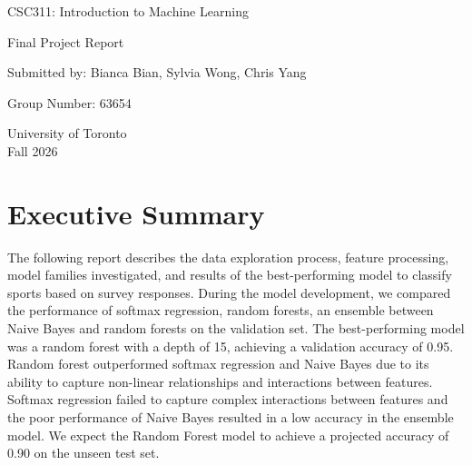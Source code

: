 \documentclass[12pt]{article}
\begin{document}
\begin{titlepage}
\centering
\vspace*{3cm}
{\Large {CSC311: Introduction to Machine Learning} \par}
\vspace{1cm}
{\Large {Final Project Report} \par}
\vspace{1cm}
\vspace{3cm}
{\large Submitted by: Bianca Bian, Sylvia Wong, Chris Yang \par}
{\large Group Number: 63654 \par}
\vspace{0.5cm}
\vfill
{\large University of Toronto \\ Fall 2026 \par}
\end{titlepage}
\clearpage
\setcounter{page}{1}
\section{Executive Summary}

The following report describes the data exploration process, feature processing, model families investigated, and results of the best-performing model to classify sports based on survey responses. During the model development, we compared the performance of softmax regression, random forests, an ensemble between Naive Bayes and random forests on the validation set. The best-performing model was a random forest with a depth of 15, achieving a validation accuracy of 0.95. Random forest outperformed softmax regression and Naive Bayes due to its ability to capture non-linear relationships and interactions between features. Softmax regression failed to capture complex interactions between features and the poor performance of Naive Bayes resulted in a low accuracy in the ensemble model. We expect the Random Forest model to achieve a projected accuracy of 0.90 on the unseen test set.
\end{document}

